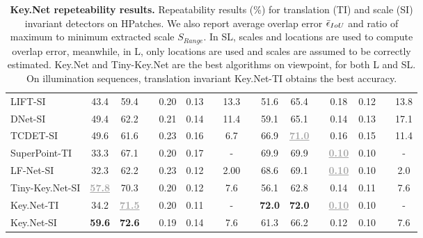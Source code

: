 \begin{landscape}
\begin{table}
\begin{center}
\begin{tabular}{lccccccclccccccc}
LIFT-SI \cite{LIFT}                    & 43.4 & 59.4 && 0.20 & 0.13 && 13.3 && 51.6 & 65.4 && 0.18 & 0.12 && 13.8 \\
DNet-SI \cite{Karel_Vedaldi_ECCV_16}   & 49.4 & 62.2 && 0.21 & 0.14 && 11.4 && 59.1 & 65.1 && 0.14 & 0.13 && 17.1 \\
TCDET-SI \cite{Zhang_Felix_CVPR_17}    & 49.6 & 61.6 && 0.23 & 0.16 && 6.7 && 66.9 & \textbf{\textcolor{darkgray}{\underline{71.0}}} && 0.16 & 0.15 && 11.4 \\
SuperPoint-TI \cite{detone2017superpoint} & 33.3 & 67.1 && 0.20 & 0.17 && - && 69.9 & 69.9 && \textbf{\textcolor{darkgray}{\underline{0.10}}} & 0.10 && - \\
LF-Net-SI \cite{OnoSerra18}            & 32.3 & 62.2 && 0.23 & 0.12 && 2.00 && 68.6 & 69.1 && \textbf{\textcolor{darkgray}{\underline{0.10}}} & 0.10 && 2.0 \\
\noalign{\smallskip}
\hline
\noalign{\smallskip}
Tiny-Key.Net-SI & \textbf{\textcolor{darkgray}{\underline{57.8}}} & 70.3 && 0.20 & 0.12 && 7.6 && 56.1 & 62.8 && 0.14 & 0.11 && 7.6 \\
Key.Net-TI & 34.2 & \textbf{\textcolor{darkgray}{\underline{71.5}}} && 0.20 & 0.11 && - && \textbf{72.0} & \textbf{72.0} && \textbf{\textcolor{darkgray}{\underline{0.10}}} & 0.10 && - \\

Key.Net-SI & \textbf{59.6} & \textbf{72.6} && 0.19 & 0.14 && 7.6 && 61.3 & 66.2 && 0.12 & 0.10 && 7.6 \\
\end{tabular}
\caption[Key.Net repeteability results]{\textbf{Key.Net repeteability results.} Repeatability results (\%) for translation (TI) and scale (SI) invariant detectors on HPatches. We also report average overlap error $\Bar{\epsilon}_{IoU}$ and ratio of maximum to minimum extracted scale $S_{Range}$. In SL, scales and locations are used to compute overlap error, meanwhile, in L, only locations are used and scales are assumed to be correctly estimated. Key.Net and Tiny-Key.Net are the best algorithms on viewpoint, for both L and SL. On illumination sequences, translation invariant Key.Net-TI obtains the best accuracy.}
\label{table:repeatability_scores}
\end{center}
\end{table}
\end{landscape}

